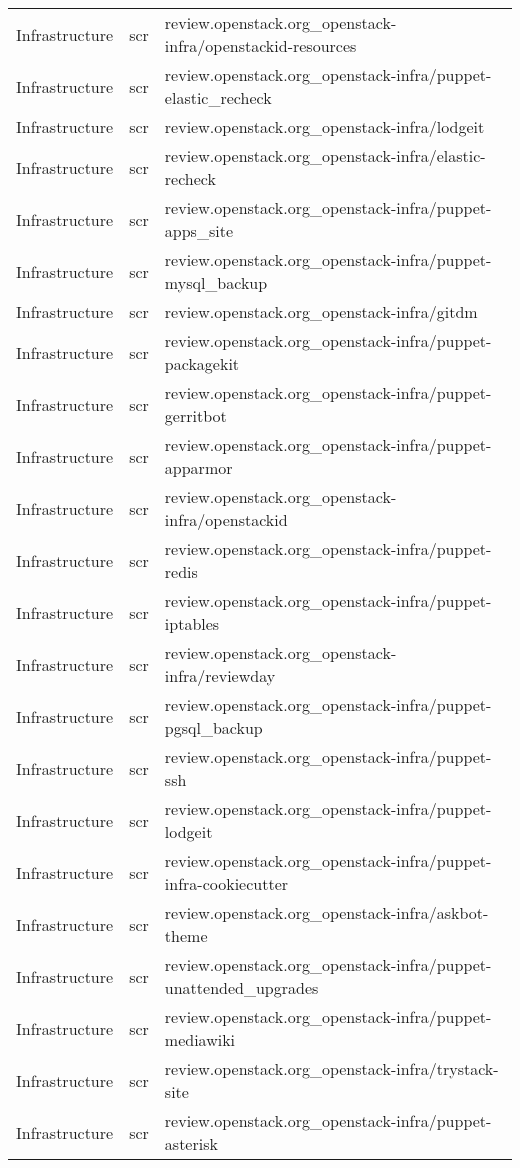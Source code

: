 \begin{center}
\begin{longtable}{|p{4cm}|p{1cm}|p{10cm}|}
Infrastructure&scr&review.openstack.org\_openstack-infra/openstackid-resources\\ 
Infrastructure&scr&review.openstack.org\_openstack-infra/puppet-elastic\_recheck\\ 
Infrastructure&scr&review.openstack.org\_openstack-infra/lodgeit\\ 
Infrastructure&scr&review.openstack.org\_openstack-infra/elastic-recheck\\ 
Infrastructure&scr&review.openstack.org\_openstack-infra/puppet-apps\_site\\ 
Infrastructure&scr&review.openstack.org\_openstack-infra/puppet-mysql\_backup\\ 
Infrastructure&scr&review.openstack.org\_openstack-infra/gitdm\\ 
Infrastructure&scr&review.openstack.org\_openstack-infra/puppet-packagekit\\ 
Infrastructure&scr&review.openstack.org\_openstack-infra/puppet-gerritbot\\ 
Infrastructure&scr&review.openstack.org\_openstack-infra/puppet-apparmor\\ 
Infrastructure&scr&review.openstack.org\_openstack-infra/openstackid\\ 
Infrastructure&scr&review.openstack.org\_openstack-infra/puppet-redis\\ 
Infrastructure&scr&review.openstack.org\_openstack-infra/puppet-iptables\\ 
Infrastructure&scr&review.openstack.org\_openstack-infra/reviewday\\ 
Infrastructure&scr&review.openstack.org\_openstack-infra/puppet-pgsql\_backup\\ 
Infrastructure&scr&review.openstack.org\_openstack-infra/puppet-ssh\\ 
Infrastructure&scr&review.openstack.org\_openstack-infra/puppet-lodgeit\\ 
Infrastructure&scr&review.openstack.org\_openstack-infra/puppet-infra-cookiecutter\\ 
Infrastructure&scr&review.openstack.org\_openstack-infra/askbot-theme\\ 
Infrastructure&scr&review.openstack.org\_openstack-infra/puppet-unattended\_upgrades\\ 
Infrastructure&scr&review.openstack.org\_openstack-infra/puppet-mediawiki\\ 
Infrastructure&scr&review.openstack.org\_openstack-infra/trystack-site\\ 
Infrastructure&scr&review.openstack.org\_openstack-infra/puppet-asterisk\\ 

\end{longtable}
\end{center}
